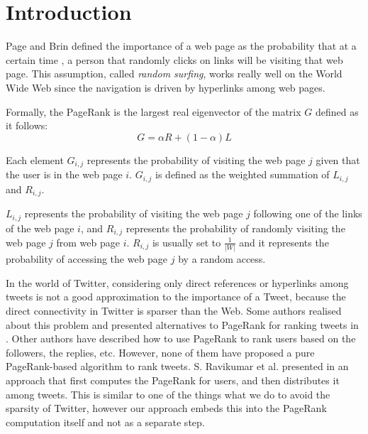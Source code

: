 \section{Introduction}
Page and Brin defined the importance of a web page as the probability that at a certain time \cite{pagebmw98}, a person that randomly clicks on links will be visiting that web page. This assumption, called \emph{random surfing}, works really well on the World Wide Web since the navigation is driven by hyperlinks among web pages. 

Formally, the PageRank is the largest real eigenvector of the matrix $G$ defined as it follows:
\begin{equation}\label{eq:basic_pr}
G = \alpha R + (1-\alpha) L
\end{equation}

Each element $G_{i,j}$ represents the probability of visiting the web page $j$ given that the user is in the web page $i$. $G_{i,j}$ is defined as the weighted summation of $L_{i,j}$ and $R_{i,j}$.

$L_{i,j}$ represents the probability of visiting the web page $j$ following one of the links of the web page $i$, and $R_{i,j}$ represents the probability of randomly visiting the web page $j$ from web page $i$. $R_{i,j}$ is usually set to $\frac{1}{|W|}$ and it represents the probability of accessing the web page $j$ by a random access. 

In the world of Twitter, considering only direct references or hyperlinks among tweets is not a good approximation to the importance of a Tweet, because the direct connectivity in Twitter is sparser than the Web. Some authors realised about this problem and presented alternatives to PageRank for ranking tweets in \cite{Duan:2010:ESL:1873781.1873815,DBLP:conf/webi/NagmotiTC10}. Other authors \cite{Duan:2010:ESL:1873781.1873815,Kwak:2010:TSN:1772690.1772751,DBLP:conf/wsdm/WelchSHC11} have described how to use PageRank to rank users based on the followers, the replies, etc. However, none of them have proposed a pure PageRank-based algorithm to rank tweets. S. Ravikumar et al. presented in \cite{DBLP:journals/corr/abs-1204-0156} an approach that first computes the PageRank for users, and then distributes it among tweets. This is similar to one of the things what we do to avoid the sparsity of Twitter, however our approach embeds this into the PageRank computation itself and not as a separate step.
